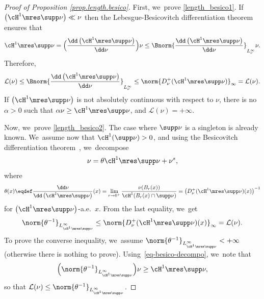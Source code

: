 \begin{proof}[Proof of Proposition \ref{prop.length.besico}]
First, we~prove \eqref{length_besico1}. If $\left(\cH^1\mres \supp \nu\right) \ll \nu$ then the Lebesgue-Besicovitch differentiation theorem ensures that
\begin{equation*}
\cH^1\mres \supp \nu = \Bigl(\frac{\dd \left(\cH^1\mres \supp\nu\right)}{\dd \nu}\Bigr)\nu \leq \Bnorm{\frac{\dd \left(\cH^1\mres \supp\nu\right)}{\dd \nu}}_{L^{\infty}_\nu}\nu.
\end{equation*}
Therefore,
\begin{equation*}
\mathcal{L}(\nu)\leq \Bnorm{\frac{\dd \left(\cH^1\mres \supp\nu\right)}{\dd \nu}}_{L^{\infty}_\nu} \leq \norm{D^+_\nu(\cH^1\mres \supp\nu)}_{\infty}=\mathcal{L}(\nu).
\end{equation*}
If $\left(\cH^1\mres \supp \nu\right)$ is not absolutely continuous with respect to $\nu$, there is no $\alpha>0$ such that $\alpha \nu \geq \cH^1\mres \supp\nu$, and $\mathcal{L}(\nu)=+\infty$.

Now, we~prove \eqref{length_besico2}. The case where $\supp \nu$ is a singleton is already known. We~\hbox{assume} now that $\cH^1(\supp \nu)>0$, and using the Besicovitch differentiation theorem~\cite[Th.\,2.22]{ambrosio2000functions}, we~decompose
\begin{equation}
\nu = \theta\cH^1\mres \supp \nu + \nu^s,\label{eq-besico-decompo}
\end{equation}
where
\[
\theta(x)\eqdef \frac{\dd \nu}{\dd \left(\cH^1\mres \supp\nu\right)}(x)= \lim_{r \to 0^+} \frac{\nu(B_r(x))}{\cH^1(B_r(x)\cap \supp \nu)} =\left(D^+_\nu(\cH^1\mres \supp\nu)(x)\right)^{-1}
\]
for $\left(\cH^1\mres \supp\nu\right)$-a.e.\ $x$. From the last equality, we~get
\begin{equation*}
\norm{\theta^{-1}}_{L^{\infty}_{\cH^1\mres \supp\nu}} \leq \norm{D^+_\nu(\cH^1\mres \supp\nu)(x)}_\infty =\mathcal{L}(\nu).
\end{equation*}
To prove the converse inequality, we~assume $\norm{\theta^{-1}}_{L^{\infty}_{\cH^1\mres \supp\nu}}<+\infty$ (otherwise there is nothing to prove). Using~\eqref{eq-besico-decompo}, we~note that
\begin{equation*}
\Bigl(\norm{\theta^{-1}}_{L^{\infty}_{\cH^1\mres \supp\nu}}\Bigr)\nu \ge \cH^1\mres \supp\nu,
\end{equation*}
so that $\mathcal{L}(\nu)\le \norm{\theta^{-1}}_{L^{\infty}_{\cH^1\mres \supp\nu}}$.
\end{proof}

